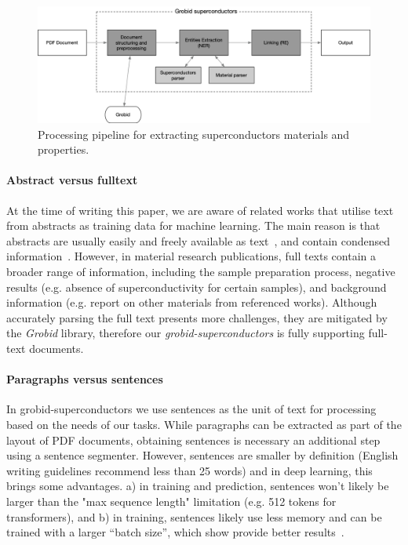 \documentclass{article}
\begin{document}
\begin{figure}[ht]
\includegraphics[width=\textwidth]{overview-schema-3}
\caption{Processing pipeline for extracting superconductors materials and properties. }
\label{fig:pipeline-overview}
\end{figure}

\paragraph{Abstract versus fulltext}
At the time of writing this paper, we are aware of related works that utilise text from abstracts as training data for machine learning. 
The main reason is that abstracts are usually easily and freely available as text~\cite{kononova_text-mined_2019}, and contain condensed information~\cite{yamaguchi-etal-2020-sc, court_magnetic_2020}. 
However, in material research publications, full texts contain a broader range of information, including the sample preparation process, negative results (e.g. absence of superconductivity for certain samples), and background information (e.g. report on other materials from referenced works). 
Although accurately parsing the full text presents more challenges, they are mitigated by the \textit{Grobid} library, therefore our \textit{grobid-superconductors} is fully supporting full-text documents. 

\paragraph{Paragraphs versus sentences}
In grobid-superconductors we use sentences as the unit of text for processing based on the needs of our tasks. 
While paragraphs can be extracted as part of the layout of PDF documents, obtaining sentences is necessary an additional step using a sentence segmenter.
However, sentences are smaller by definition (English writing guidelines recommend less than 25 words) and in deep learning, this brings some advantages. 
a) in training and prediction, sentences won't likely be larger than the "max sequence length" limitation (e.g. 512 tokens for transformers), and b) in training, sentences likely use less memory and can be trained with a larger ``batch size'', which show provide better results~\cite{roberta}.
\end{document}

